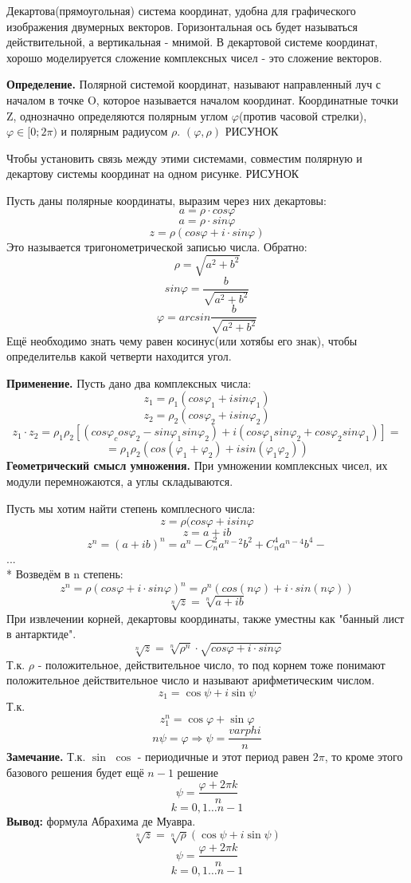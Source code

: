 \documentclass{article}
\begin{document}
Декартова(прямоугольная) система координат, удобна для графического изображения двумерных векторов. Горизонтальная ось будет называться действительной, а вертикальная - мнимой. В декартовой системе координат, хорошо моделируется сложение комплексных чисел - это сложение векторов.

{\bf Определение.} Полярной системой координат, называют направленный луч с началом в точке O, которое называется началом координат. Координатные точки Z, однозначно определяются полярным углом $\varphi$(против часовой стрелки), $\varphi \in [0;2\pi)$ и полярным радиусом $\rho$. $(\varphi,\rho)$ РИСУНОК

Чтобы установить связь между этими системами, совместим полярную и декартову системы координат на одном рисунке. РИСУНОК

Пусть даны полярные координаты, выразим через них декартовы:
$$a=\rho \cdot cos\varphi$$
$$a=\rho \cdot sin\varphi$$
$$z=\rho(cos\varphi+i\cdot sin\varphi)$$
Это  называется тригонометрической записью числа. Обратно:
$$\rho=\sqrt{a^2+b^2}$$
$$sin\varphi=\frac{b}{\sqrt{a^2+b^2}}$$
$$\varphi=arcsin\frac{b}{\sqrt{a^2+b^2}}$$
Ещё необходимо знать чему равен косинус(или хотябы его знак), чтобы определительв какой четверти находится угол.

{\bf Применение.} Пусть дано два комплексных числа: $$z_1=\rho_1(cos\varphi_1+isin\varphi_1)$$
$$z_2=\rho_2(cos\varphi_2+isin\varphi_2)$$
$$z_1\cdot z_2=\rho_1\rho_2[(cos\varphi_cos\varphi_2-sin\varphi_1 sin\varphi_2)+i(cos\varphi_1 sin\varphi_2+cos\varphi_2 sin\varphi_1)]=$$
$$=\rho_1\rho_2(cos(\varphi_1+\varphi_2)+isin(\varphi_1\varphi_2))$$
{\bf Геометрический смысл умножения.} При умножении комплексных чисел, их модули перемножаются, а углы складываются.

Пусть мы хотим найти степень комплесного числа: $$z=\rho(cos\varphi+isin\varphi$$
$$z=a+ib$$
$$z^n=(a+ib)^n=a^n-C^2_n a^{n-2}b^2+C^4_n a^{n-4}b^4-$$...\\*
Возведём в n степень: $$z^n=\rho(cos\varphi+i\cdot sin\varphi)^n=\rho^n(cos(n\varphi)+i\cdot sin(n\varphi))$$
$$\sqrt[n]{z}=\sqrt[n]{a+ib}$$
При извлечении корней, декартовы координаты, также уместны как "банный лист в антарктиде". $$\sqrt[n]{z}=\sqrt[n]{\rho^n}\cdot \sqrt{cos\varphi+i\cdot sin\varphi}$$
Т.к. $\rho$ - положительное, действительное число, то под корнем тоже понимают положительное действительное число и называют арифметическим числом. $$z_1=\cos\psi+i\sin\psi$$
Т.к. $$z^n_1=\cos\varphi+\sin\varphi$$
$$n\psi=\varphi\Rightarrow\psi=\frac{varphi}{n}$$
{\bf Замечание.} Т.к. $\sin$ $\cos$ - периодичные и этот период равен $2\pi$, то кроме этого базового решения будет ещё $n-1$ решение $$\psi=\frac{\varphi+2\pi k}{n}$$
$$k=0,1\ldots n-1$$
{\bf Вывод:} формула Абрахима де Муавра.
$$\sqrt[n]{z}=\sqrt[n]{\rho}(\cos\psi+i\sin\psi)$$
$$\psi=\frac{\varphi+2\pi k}{n}$$
$$k=0,1\ldots n-1$$
\end{document}
